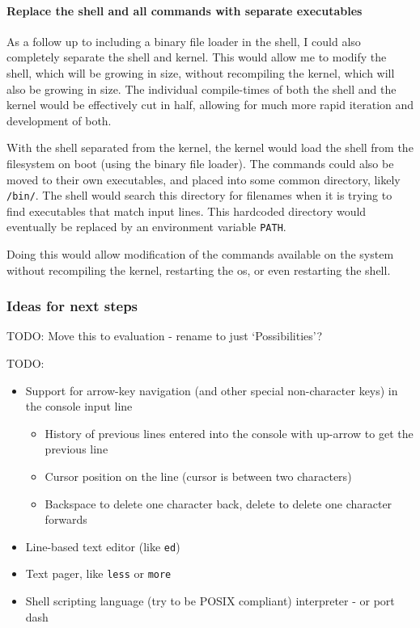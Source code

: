 \documentclass{article}
\begin{document}
\paragraph{Replace the shell and all commands with separate executables}
As a follow up to including a binary file loader in the shell, I could also
completely separate the shell and kernel. This would allow me to modify the
shell, which will be growing in size, without recompiling the kernel, which
will also be growing in size. The individual compile-times of both the shell
and the kernel would be effectively cut in half, allowing for much more rapid
iteration and development of both.

With the shell separated from the kernel, the kernel would load the shell from
the filesystem on boot (using the binary file loader). The commands could also
be moved to their own executables, and placed into some common directory,
likely \texttt{/bin/}. The shell would search this directory for filenames when
it is trying to find executables that match input lines. This hardcoded
directory would eventually be replaced by an environment variable
\texttt{PATH}.

Doing this would allow modification of the commands available on the system
without recompiling the kernel, restarting the \gls{os}, or even restarting the
shell.

\subsubsection{Ideas for next steps}
TODO: Move this to evaluation - rename to just `Possibilities'?

TODO:
\begin{itemize}
    \item Support for arrow-key navigation (and other special non-character
        keys) in the console input line
        \begin{itemize}
            \item History of previous lines entered into the console with
                up-arrow to get the previous line
            \item Cursor position on the line (cursor is between two
                characters)
            \item Backspace to delete one character back, delete to delete one
                character forwards
        \end{itemize}
    \item Line-based text editor (like \texttt{ed})
    \item Text pager, like \texttt{less} or \texttt{more}
    \item Shell scripting language (try to be POSIX compliant) interpreter - or
        port dash~\cite{dash-shell}
\end{itemize}
\end{document}
